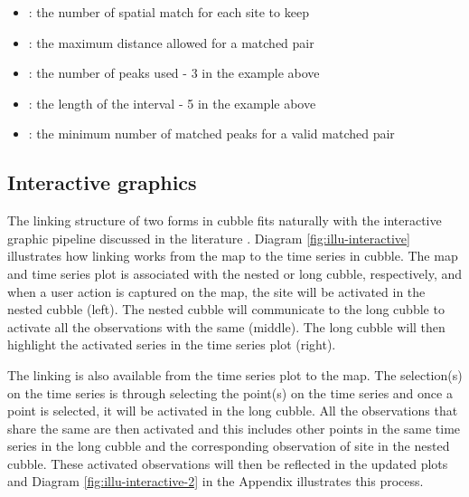 \documentclass[
]{jss}
\providecommand{\tightlist}{%
  \setlength{\itemsep}{0pt}\setlength{\parskip}{0pt}}
\begin{document}
\begin{itemize}
\tightlist
\item
  : the number of spatial match for each site to keep
\item
  : the maximum distance allowed for a matched pair
\item
  : the number of peaks used - 3 in the example above
\item
  : the length of the interval - 5 in the example above
\item
  : the minimum number of matched peaks for a valid matched pair
\end{itemize}

\hypertarget{interactive-graphics}{%
\subsection{Interactive graphics}\label{interactive-graphics}}

The linking structure of two forms in cubble fits naturally with the interactive graphic pipeline discussed in the literature \citep{buja1988elements, buja1996interactive, sutherland2000orca, xie2014reactive, cheng2016enabling}. Diagram \ref{fig:illu-interactive} illustrates how linking works from the map to the time series in cubble. The map and time series plot is associated with the nested or long cubble, respectively, and when a user action is captured on the map, the site will be activated in the nested cubble (left). The nested cubble will communicate to the long cubble to activate all the observations with the same  (middle). The long cubble will then highlight the activated series in the time series plot (right).

The linking is also available from the time series plot to the map. The selection(s) on the time series is through selecting the point(s) on the time series and once a point is selected, it will be activated in the long cubble. All the observations that share the same  are then activated and this includes other points in the same time series in the long cubble and the corresponding observation of site in the nested cubble. These activated observations will then be reflected in the updated plots and Diagram \ref{fig:illu-interactive-2} in the Appendix illustrates this process.
\end{document}
